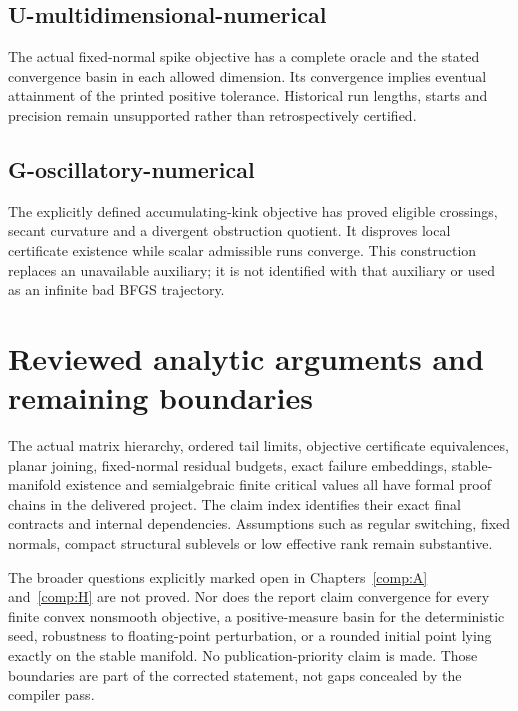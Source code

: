 \subsection{U-multidimensional-numerical}\label{u-multidimensional-numerical}

The actual fixed-normal spike objective has a complete oracle and the stated convergence basin in each allowed dimension. Its convergence implies eventual attainment of the printed positive tolerance. Historical run lengths, starts and precision remain unsupported rather than retrospectively certified.



\subsection{G-oscillatory-numerical}\label{g-oscillatory-numerical}

The explicitly defined accumulating-kink objective has proved eligible crossings, secant curvature and a divergent obstruction quotient. It disproves local certificate existence while scalar admissible runs converge. This construction replaces an unavailable auxiliary; it is not identified with that auxiliary or used as an infinite bad BFGS trajectory.



\section{Reviewed analytic arguments and remaining boundaries}\label{analytic-steps-that-still-require-independent-review}

The actual matrix hierarchy, ordered tail limits, objective certificate equivalences, planar joining, fixed-normal residual budgets, exact failure embeddings, stable-manifold existence and semialgebraic finite critical values all have formal proof chains in the delivered project. The claim index identifies their exact final contracts and internal dependencies. Assumptions such as regular switching, fixed normals, compact structural sublevels or low effective rank remain substantive.

The broader questions explicitly marked open in Chapters~\ref{comp:A} and~\ref{comp:H} are not proved. Nor does the report claim convergence for every finite convex nonsmooth objective, a positive-measure basin for the deterministic seed, robustness to floating-point perturbation, or a rounded initial point lying exactly on the stable manifold. No publication-priority claim is made. Those boundaries are part of the corrected statement, not gaps concealed by the compiler pass.

